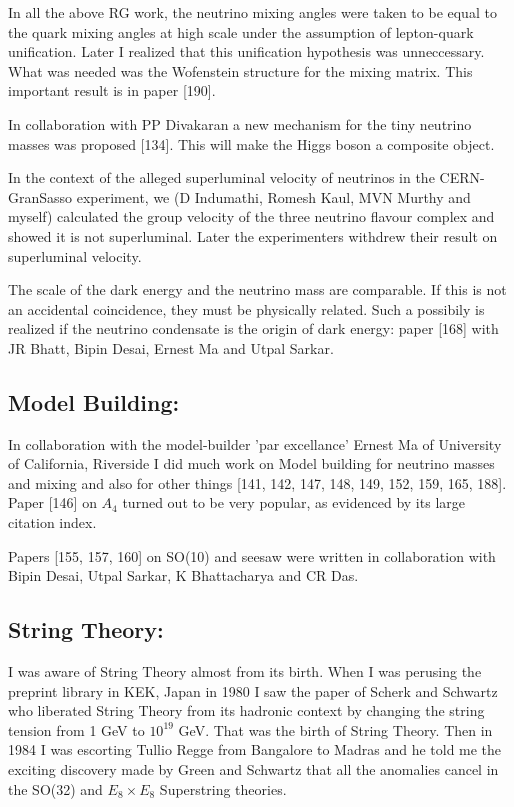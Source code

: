 In all the above RG work, the neutrino mixing angles were taken to be 
equal to the quark mixing angles at high scale under the assumption of 
lepton-quark unification. Later I realized that this unification 
hypothesis was unneccessary. What was needed was the Wofenstein 
structure for the mixing matrix. This important result is in paper 
[190].

In collaboration with PP Divakaran a new mechanism for the tiny neutrino 
masses was proposed [134]. This will make the Higgs boson a composite 
object.

In the context of the alleged superluminal velocity of neutrinos in the 
CERN-GranSasso experiment, we (D Indumathi, Romesh Kaul, MVN Murthy and 
myself) calculated the group velocity of the three neutrino flavour 
complex and showed it is not superluminal. Later the experimenters 
withdrew their result on superluminal velocity.

The scale of the dark energy and the neutrino mass are comparable. If 
this is not an accidental coincidence, they must be physically related. 
Such a possibily is realized if the neutrino condensate is the origin of 
dark energy: paper [168] with JR Bhatt, Bipin Desai, Ernest Ma and Utpal 
Sarkar.

\subsection*{Model Building: }

In collaboration with the model-builder 'par excellance' Ernest Ma of 
University of California, Riverside I did much work on Model building 
for neutrino masses and mixing and also for other things 
[141, 142, 147, 148, 149, 152, 159, 165, 188]. Paper [146] on $A_4$ turned out to 
be very popular, as evidenced by its large citation index.

Papers [155, 157, 160] on SO(10) and seesaw were written in collaboration 
with Bipin Desai, Utpal Sarkar, K Bhattacharya and CR Das.

\subsection*{String Theory: }

I was aware of String Theory almost from its birth. When I was perusing 
the preprint library in KEK, Japan in 1980 I saw the paper of Scherk and 
Schwartz who liberated String Theory from its hadronic context by 
changing the string tension from 1 GeV to $10^{19}$ GeV. That was the birth 
of String Theory. Then in 1984 I was escorting Tullio Regge from 
Bangalore to Madras and he told me the exciting discovery made by Green 
and Schwartz that all the anomalies cancel in the SO(32) and $E_8 \times E_8$ 
Superstring theories.

